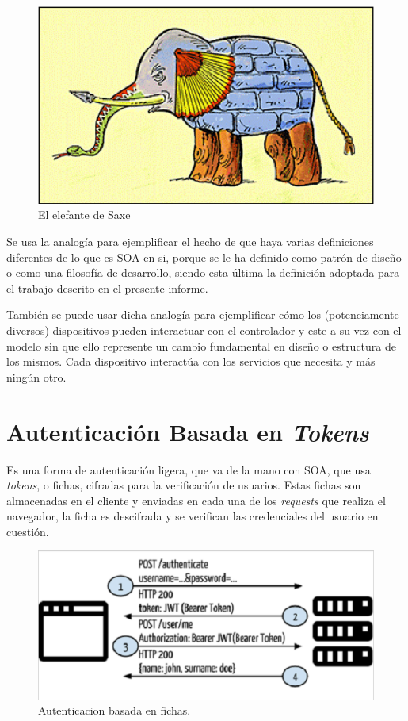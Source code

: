     \begin{figure}[htbp!]
        \begin{center}
            \includegraphics[width=.8\textwidth]{figures/Elefante}
        \end{center}
        \caption {El elefante de Saxe}
        \label{elefante-saxe}
    \end{figure}

    Se usa la analogía para ejemplificar el hecho de que haya varias definiciones diferentes de lo que es SOA en si, porque se le ha definido como patrón de diseño o como una filosofía de desarrollo, siendo esta última la definición adoptada para el trabajo descrito en el presente informe.
    
    También se puede usar dicha analogía para ejemplificar cómo los (potenciamente diversos) dispositivos pueden interactuar con el controlador y este a su vez con el modelo sin que ello represente un cambio fundamental en diseño o estructura de los mismos. Cada dispositivo interactúa con los servicios que necesita y más ningún otro.


    \section{Autenticación Basada en \textit{Tokens}}
    
    Es una forma de autenticación ligera, que va de la mano con SOA, que usa \textit{tokens}, o fichas, cifradas para la verificación de usuarios. Estas fichas son almacenadas en el cliente y enviadas en cada una de los \textit{requests} que realiza el navegador, la ficha es descifrada y se verifican las credenciales del usuario en cuestión\cite{TOKEN-tokenbasedauth}.
    
    \begin{figure}[htbp!]
        \begin{center}
            \includegraphics[width=.7\textwidth]{figures/tokenbarequest}
        \end{center}
        \caption{Autenticacion basada en fichas.}
        \label{tba-request}
    \end{figure}
    
